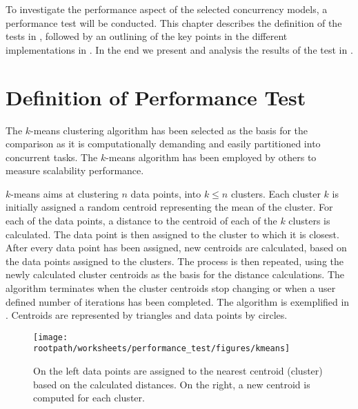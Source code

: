 \makeatletter {}\makeatother
{}
%
To investigate the performance aspect of the selected concurrency models, a performance test will be conducted.  This chapter describes the definition of the tests in , followed by an outlining of the key points in the different implementations in . In the end we present and analysis the results of the test in .
\label{chap:performance}
\section{Definition of Performance Test}
\label{sec:test_approach}
The $k$-means clustering algorithm has been selected as the basis for the comparison as it is computationally demanding and easily partitioned into concurrent tasks\cite[p. 128]{epstein2011towards}. The $k$-means algorithm has been employed by others to measure scalability performance\cite{epstein2011towards}\cite{tardieu2014x10}.

$k$-means aims at clustering $n$ data points, into $k \leq n$ clusters\cite[p. 451]{dataminingconceptsandtechniques}\cite[p. 128]{epstein2011towards}. Each cluster $k$ is initially assigned a random centroid representing the mean of the cluster. For each of the data points, a distance to the centroid of each of the $k$ clusters is calculated. The data point is then assigned to the cluster to which it is closest. After every data point has been assigned, new centroids are calculated, based on the data points assigned to the clusters. The process is then repeated, using the newly calculated cluster centroids as the basis for the distance calculations. The algorithm terminates when the cluster centroids stop changing or when a user defined number of iterations has been completed\cite[p. 128]{epstein2011towards}. The algorithm is exemplified in . Centroids are represented by triangles and data points by circles.

\begin{figure}[ht!]
\centering
\texttt{[image: \\rootpath/worksheets/performance\_test/figures/kmeans]}
\caption{On the left data points are assigned to the nearest centroid (cluster) based on the calculated distances. On the right, a new centroid is computed for each cluster.}\label{fig:kmeans}
\end{figure}

